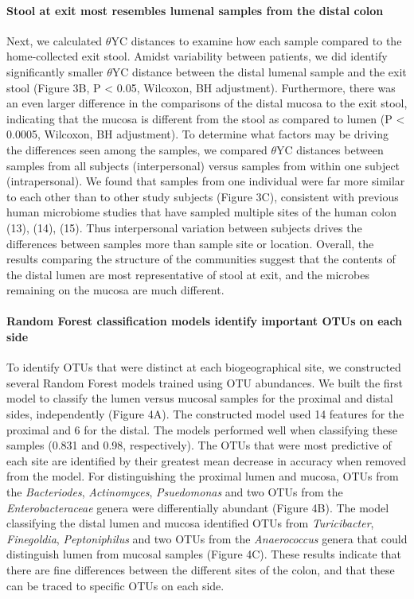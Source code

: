 \documentclass[11pt,]{article}
\let\oldparagraph\paragraph
\renewcommand{\paragraph}[1]{\oldparagraph{#1}\mbox{}}
\begin{document}
\paragraph{Stool at exit most resembles lumenal samples from the distal
colon}\label{stool-at-exit-most-resembles-lumenal-samples-from-the-distal-colon}

Next, we calculated \({\theta}\)YC distances to examine how each sample
compared to the home-collected exit stool. Amidst variability between
patients, we did identify significantly smaller \({\theta}\)YC distance
between the distal lumenal sample and the exit stool (Figure 3B, P
\textless{} 0.05, Wilcoxon, BH adjustment). Furthermore, there was an
even larger difference in the comparisons of the distal mucosa to the
exit stool, indicating that the mucosa is different from the stool as
compared to lumen (P \textless{} 0.0005, Wilcoxon, BH adjustment). To
determine what factors may be driving the differences seen among the
samples, we compared \({\theta}\)YC distances between samples from all
subjects (interpersonal) versus samples from within one subject
(intrapersonal). We found that samples from one individual were far more
similar to each other than to other study subjects (Figure 3C),
consistent with previous human microbiome studies that have sampled
multiple sites of the human colon (13), (14), (15). Thus interpersonal
variation between subjects drives the differences between samples more
than sample site or location. Overall, the results comparing the
structure of the communities suggest that the contents of the distal
lumen are most representative of stool at exit, and the microbes
remaining on the mucosa are much different.

\paragraph{Random Forest classification models identify important OTUs
on each
side}\label{random-forest-classification-models-identify-important-otus-on-each-side}

To identify OTUs that were distinct at each biogeographical site, we
constructed several Random Forest models trained using OTU abundances.
We built the first model to classify the lumen versus mucosal samples
for the proximal and distal sides, independently (Figure 4A). The
constructed model used 14 features for the proximal and 6 for the
distal. The models performed well when classifying these samples (0.831
and 0.98, respectively). The OTUs that were most predictive of each site
are identified by their greatest mean decrease in accuracy when removed
from the model. For distinguishing the proximal lumen and mucosa, OTUs
from the \emph{Bacteriodes}, \emph{Actinomyces}, \emph{Psuedomonas} and
two OTUs from the \emph{Enterobacteraceae} genera were differentially
abundant (Figure 4B). The model classifying the distal lumen and mucosa
identified OTUs from \emph{Turicibacter}, \emph{Finegoldia},
\emph{Peptoniphilus} and two OTUs from the \emph{Anaerococcus} genera
that could distinguish lumen from mucosal samples (Figure 4C). These
results indicate that there are fine differences between the different
sites of the colon, and that these can be traced to specific OTUs on
each side.
\end{document}
